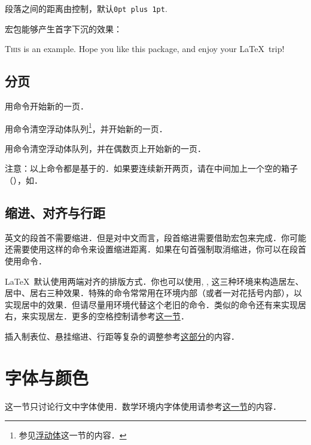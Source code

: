 段落之间的距离由控制，默认\texttt{0pt plus 1pt}. 
\begin{latex}
\setlength{\parskip}{0pt}
\end{latex}

宏包能够产生首字下沉的效果：
\begin{codeshow}
\lettrine{T}{his} is an example. Hope you like this package, and enjoy your \LaTeX\ trip!
\end{codeshow}

\subsection{分页}
用命令开始新的一页．

用命令清空浮动体队列\footnote{参见\hyperref[sec:float]{浮动体}这一节的内容．}，并开始新的一页．

用命令清空浮动体队列，并在偶数页上开始新的一页．

注意：以上命令都是基于的．如果要连续新开两页，请在中间加上一个空的箱子（），如．

\subsection{缩进、对齐与行距}
英文的段首不需要缩进．但是对中文而言，段首缩进需要借助宏包来完成．你可能还需要使用这样的命令来设置缩进距离．如果在句首强制取消缩进，你可以在段首使用命令．

\LaTeX\ 默认使用两端对齐的排版方式．你也可以使用, , 这三种环境来构造居左、居中、居右三种效果．特殊的命令常常用在环境内部（或者一对花括号内部），以实现居中的效果．但请尽量用环境代替这个老旧的命令．类似的命令还有来实现居右，来实现居左．更多的空格控制请参考\hyperref[sec:hvspace]{这一节}．

插入制表位、悬挂缩进、行距等复杂的调整参考\hyperref[sec:hvspace]{这部分}的内容．

\section{字体与颜色}
\label{sec:font}
这一节只讨论行文中字体使用．数学环境内字体使用请参考\hyperref[sec:mathfont]{这一节}的内容．

